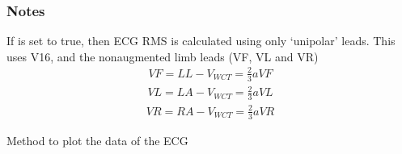 \documentclass[letterpaper,10pt,english]{sphinxmanual}
\begin{document}
\begin{fulllineitems}
\begin{fulllineitems}
\begin{quote}
\begin{description}
\begin{itemize}
\end{itemize}

\end{description}\end{quote}


\nopagebreak


\sphinxAtStartPar
{\hyperref[\detokenize{_autosummary/signalanalysis.general.Signal:id1}]{}}


\subsubsection*{Notes}

\sphinxAtStartPar
If  is set to true, then ECG RMS is calculated using only ‘unipolar’ leads. This uses V1\sphinxhyphen{}6,
and the non\sphinxhyphen{}augmented limb leads (VF, VL and VR)
\begin{equation*}
\begin{split}VF = LL-V_{WCT} = \frac{2}{3}aVF\end{split}
\end{equation*}\begin{equation*}
\begin{split}VL = LA-V_{WCT} = \frac{2}{3}aVL\end{split}
\end{equation*}\begin{equation*}
\begin{split}VR = RA-V_{WCT} = \frac{2}{3}aVR\end{split}
\end{equation*}
\end{fulllineitems}


\begin{fulllineitems}
\label{\detokenize{_autosummary/signalanalysis.ecg.Ecg:signalanalysis.ecg.Ecg.plot}}
\sphinxAtStartPar
Method to plot the data of the ECG


\end{fulllineitems}
\end{fulllineitems}
\end{document}
